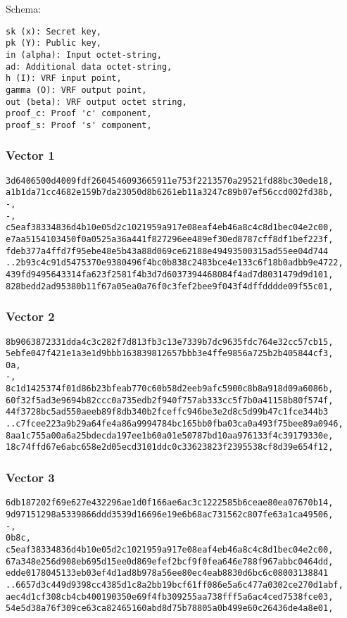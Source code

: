 \documentclass[
]{article}
\begin{document}
Schema:

\begin{verbatim}
sk (x): Secret key,
pk (Y): Public key,
in (alpha): Input octet-string,
ad: Additional data octet-string,
h (I): VRF input point,
gamma (O): VRF output point,
out (beta): VRF output octet string,
proof_c: Proof 'c' component,
proof_s: Proof 's' component,
\end{verbatim}

\subsubsection{Vector 1}\label{vector-1}

\begin{verbatim}
3d6406500d4009fdf2604546093665911e753f2213570a29521fd88bc30ede18,
a1b1da71cc4682e159b7da23050d8b6261eb11a3247c89b07ef56ccd002fd38b,
-,
-,
c5eaf38334836d4b10e05d2c1021959a917e08eaf4eb46a8c4c8d1bec04e2c00,
e7aa5154103450f0a0525a36a441f827296ee489ef30ed8787cff8df1bef223f,
fdeb377a4ffd7f95ebe48e5b43a88d069ce62188e49493500315ad55ee04d744
..2b93c4c91d5475370e9380496f4bc0b838c2483bce4e133c6f18b0adbb9e4722,
439fd9495643314fa623f2581f4b3d7d6037394468084f4ad7d8031479d9d101,
828bedd2ad95380b11f67a05ea0a76f0c3fef2bee9f043f4dffdddde09f55c01,
\end{verbatim}

\subsubsection{Vector 2}\label{vector-2}

\begin{verbatim}
8b9063872331dda4c3c282f7d813fb3c13e7339b7dc9635fdc764e32cc57cb15,
5ebfe047f421e1a3e1d9bbb163839812657bbb3e4ffe9856a725b2b405844cf3,
0a,
-,
8c1d1425374f01d86b23bfeab770c60b58d2eeb9afc5900c8b8a918d09a6086b,
60f32f5ad3e9694b82ccc0a735edb2f940f757ab333cc5f7b0a41158b80f574f,
44f3728bc5ad550aeeb89f8db340b2fceffc946be3e2d8c5d99b47c1fce344b3
..c7fcee223a9b29a64fe4a86a9994784bc165bb0fba03ca0a493f75bee89a0946,
8aa1c755a00a6a25bdecda197ee1b60a01e50787bd10aa976133f4c39179330e,
18c74ffd67e6abc658e2d05ecd3101ddc0c33623823f2395538cf8d39e654f12,
\end{verbatim}

\subsubsection{Vector 3}\label{vector-3}

\begin{verbatim}
6db187202f69e627e432296ae1d0f166ae6ac3c1222585b6ceae80ea07670b14,
9d97151298a5339866ddd3539d16696e19e6b68ac731562c807fe63a1ca49506,
-,
0b8c,
c5eaf38334836d4b10e05d2c1021959a917e08eaf4eb46a8c4c8d1bec04e2c00,
67a348e256d908eb695d15ee0d869efef2bcf9f0fea646e788f967abbc0464dd,
edde0178045133eb03ef4d1ad8b978a56ee80ec4eab8830d6bc6c08003138841
..6657d3c449d9398cc4385d1c8a2bb19bcf61ff086e5a6c477a0302ce270d1abf,
aec4d1cf308cb4cb400190350e69f4fb309255aa738fff5a6ac4ced7538fce03,
54e5d38a76f309ce63ca82465160abd8d75b78805a0b499e60c26436de4a8e01,
\end{verbatim}
\end{document}

